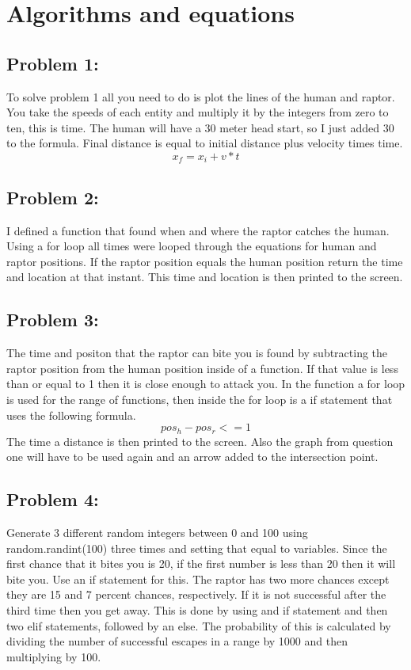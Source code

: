 \documentclass[twocolumn]{revtex4}
\begin{document}
\section{Algorithms and equations} 

\subsection{Problem 1:}
To solve problem 1 all you need to do is plot the lines of the human and raptor. You take the speeds of each entity and multiply it by the integers from zero to ten, this is time. The human will have a 30 meter head start, so I just added 30 to the formula. Final distance is equal to initial distance plus velocity times time.
	$${x_f} = {x_i} + v*t$$
	
	
	
\subsection{Problem 2:} I defined a function that found when and where the raptor catches the human. Using a for loop all times were looped through the equations for human and raptor positions. If the raptor position equals the human position return the time and location at that instant. This time and location is then printed to the screen.

\subsection{Problem 3:} The time and positon that the raptor can bite you is found by subtracting the raptor position from the human position inside of a function. If that value is less than or equal to 1 then it is close enough to attack you. In the function a for loop is used for the range of functions, then inside the for loop is a if statement that uses the following formula.
$$ pos_h - pos_r <= 1$$
The time a distance is then printed to the screen. Also the graph from question one will have to be used again and an arrow added to the intersection point.

\subsection{Problem 4:} Generate 3 different random integers between 0 and 100 using random.randint(100) three times and setting that equal to variables. Since the first chance that it bites you is 20, if the first number is less than 20 then it will bite you. Use an if statement for this. The raptor has two more chances except they are 15 and 7 percent chances, respectively. If it is not successful after the third time then you get away. This is done by using and if statement and then two elif statements, followed by an else. The probability of this is calculated by dividing the number of successful escapes in a range by 1000 and then multiplying by 100.
\end{document}
